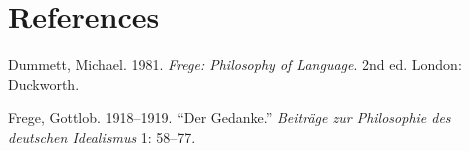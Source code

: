 \documentclass{scrbook}
\newlength{\cslhangindent}
\newlength{\cslentryspacingunit} %
\newenvironment{CSLReferences}[2] %
 {%
  \setlength{\parindent}{0pt}
  \ifodd #1
  \let\oldpar\par
  \def\par{\hangindent=\cslhangindent\oldpar}
  \fi
  \setlength{\parskip}{#2\cslentryspacingunit}
 }%
 {}
\begin{document}
\section*{References}\label{c3-c3-references}

\label{c3-refs}
\begin{CSLReferences}{1}{0}
Dummett, Michael. 1981. \emph{Frege: Philosophy of Language}. 2nd ed.
{London}: {Duckworth}.

Frege, Gottlob. 1918--1919. {``Der Gedanke.''} \emph{Beiträge zur
Philosophie des deutschen Idealismus} 1: 58--77.

\end{CSLReferences}



\backmatter
\clearpage
\pagestyle{empty}


{\hypersetup{linkcolor=black}
}
\end{document}
